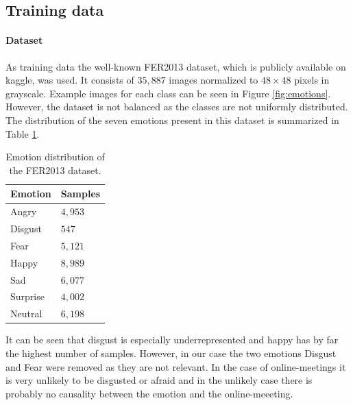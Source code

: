 \documentclass{article}
\begin{document}
\subsection{Training data}
\paragraph{Dataset} As training data the well-known FER2013 dataset, which is publicly available on kaggle, was used.  It consists of $35,887$ images normalized to $48 \times 48$ pixels in grayscale. Example images for each class can be seen in Figure \ref{fig:emotions}. However, the dataset is not balanced as the classes are not uniformly distributed. The distribution of the seven emotions present in this dataset is summarized in Table \ref{tab:fer}.

\begin{table}
  \centering
\begin{tabular}{ |p{2cm}||p{2cm}| }
 \hline
 Emotion & Samples\\
 \hline
 Angry & $4,953$\\
 \hline
 Disgust & $547$\\
 \hline
 Fear & $5,121$\\
 \hline
 Happy & $8,989$\\
 \hline
 Sad & $6,077$\\
 \hline
 Surprise & $4,002$\\
 \hline
 Neutral & $6,198$\\
 \hline
\end{tabular}
\caption{Emotion distribution of the FER2013 dataset.}
\label{tab:fer}
\end{table}

It can be seen that disgust is especially underrepresented and happy has by far the highest number of samples. However, in our case the two emotions Disgust and Fear were removed as they are not relevant. In the case of online-meetings it is very unlikely to be disgusted or afraid and in the unlikely case there is probably no causality between the emotion and the online-meeeting.
\end{document}
